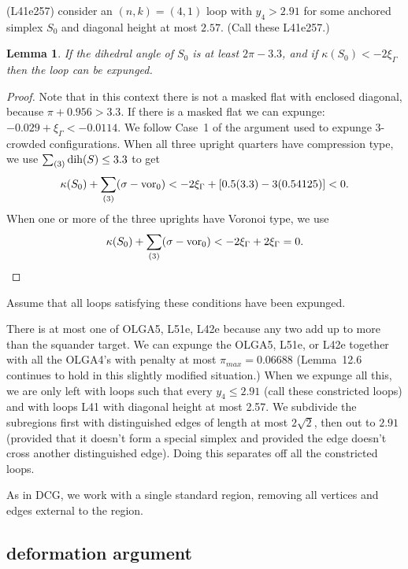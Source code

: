 \documentclass[11pt]{amsart}
\def\op#1{{\text{#1}}}
\def\text{\hbox}
\newtheorem{lemma}[subsubsection]{Lemma}
\begin{document}
(L41e257) consider an $(n,k)=(4,1)$ loop with $y_4>2.91$ for some anchored simplex $S_0$ and diagonal
height at most $2.57$.  (Call these L41e257.)  
\begin{lemma}
If the dihedral angle of $S_0$ is at least $2\pi - 3.3$, and if $\kappa(S_0)< -2\xi_\Gamma$
then the loop can be expunged.
\end{lemma}
\begin{proof}
Note that in this context there is not a masked flat with enclosed diagonal, because $\pi + 0.956 > 3.3$.  If there is a masked flat
we can expunge: $-0.029 + \xi_\Gamma < -0.0114$.  We follow Case~1 of the argument used to expunge $3$-crowded configurations. 
When all three upright quarters have compression type, we use
$\sum_{(3)} \op{dih}(S) \le 3.3$ to get
   $$\kappa(S_0) + \sum_{(3)}(\sigma-\op{vor}_0) < 
      - 2\xi_\Gamma + [0.5 (3.3) - 3 (0.54125)] < 0.$$
When one or more of the three uprights have Voronoi type, we use
  $$\kappa(S_0) + \sum_{(3)}(\sigma - \op{vor}_0 ) <
    -2 \xi_\Gamma
    +2 \xi_\Gamma
     =0.$$
\end{proof}
Assume that all loops satisfying these conditions have been expunged.



There is at most one of OLGA5, L51e, L42e because any two add up to more
than the squander target.  We can expunge the OLGA5, L51e, or L42e together
with all the OLGA4's with penalty at most $\pi_{max}=0.06688$ (Lemma~12.6 continues
to hold in this slightly modified situation.)  When we expunge all this,
we are only left with loops such that every $y_4\le 2.91$ (call these constricted loops) and with loops L41
with diagonal height at most 2.57.    We subdivide the subregions first with
distinguished edges of length at most $2\sqrt2$, then out to $2.91$ (provided
that it doesn't form a special simplex and provided the edge doesn't cross another distinguished edge).  Doing this separates off all the
constricted loops.  

As in DCG, we work with a single standard region, 
removing all vertices and edges
external to the region.

\subsection{deformation argument}
\end{document}
